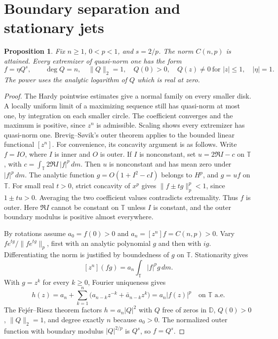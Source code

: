 \documentclass[11pt]{article}
\newtheorem{proposition}[theorem]{Proposition}
\newcommand{\D}{\mathbb D}
\newcommand{\T}{\mathbb T}
\newcommand{\coef}[1]{[z^{#1}]}
\begin{document}
\section{Boundary separation and stationary jets}

\begin{proposition}\label{prop:boundary}
Fix \(n\ge1\), \(0<p<1\), and \(s=2/p\). The norm \(C(n,p)\)
is attained. Every extremizer of quasi-norm one has the form
\[
 f=\eta Q^s,\qquad
 \deg Q=n,\quad \|Q\|_2=1,\quad Q(0)>0,\quad
 Q(z)\ne0\ \text{for }|z|\le1,\quad |\eta|=1 .
\]
The power uses the analytic logarithm of \(Q\) which is real at zero.
\end{proposition}

\begin{proof}
The Hardy pointwise estimates give a normal family on every smaller
disk. A locally uniform limit of a maximizing sequence still has
quasi-norm at most one, by integration on each smaller circle.
The coefficient converges and the maximum is positive, since \(z^n\)
is admissible. Scaling shows every extremizer has quasi-norm one.
Brevig--S{\o}vik's outer theorem \cite[Thm.~1]{BrevigSovik} applies
to the bounded linear functional \(\coef n\). For convenience, its
concavity argument is as follows. Write \(f=IO\), where \(I\) is
inner and \(O\) is outer. If \(I\) is nonconstant, set
\(u=2\Re I-c\) on \(\T\), with
\(c=\int_{\T}2\Re I\,|f|^p\,dm\). Then \(u\) is nonconstant and has
mean zero under \(|f|^p\,dm\). The analytic function
\(g=O(1+I^2-cI)\) belongs to \(H^p\), and \(g=uf\) on \(\T\).
For small real \(t>0\), strict concavity of \(x^p\) gives
\(\|f\pm tg\|_p^p<1\), since \(1\pm tu>0\).
Averaging the two coefficient values contradicts extremality.
Thus \(f\) is outer. Here \(\Re I\) cannot be constant on \(\T\)
unless \(I\) is constant, and the outer boundary modulus is positive
almost everywhere.

By rotations assume \(a_0=f(0)>0\) and \(a_n=\coef n f=C(n,p)>0\).
Vary \(f e^{t g}/\|f e^{t g}\|_p\), first with an analytic polynomial
\(g\) and then with \(ig\). Differentiating the norm is justified
by boundedness of \(g\) on \(\T\). Stationarity gives
\[
 \coef n(fg)=a_n\int_{\T}|f|^p g\,dm .
\]
With \(g=z^k\) for every \(k\ge0\), Fourier uniqueness gives
\[
 h(z)=a_n+\sum_{k=1}^n
       \bigl(a_{n-k}z^{-k}+\bar a_{n-k}z^k\bigr)
     =a_n |f(z)|^p \quad\text{on }\T\text{ a.e.}
\]
The Fej\'er--Riesz theorem factors \(h=a_n |Q|^2\) with
\(Q\) free of zeros in \(\D\), \(Q(0)>0\), \(\|Q\|_2=1\), and
degree exactly \(n\) because \(a_0>0\). The normalized outer function
with boundary modulus \(|Q|^{2/p}\) is \(Q^s\), so \(f=Q^s\).


\end{proof}
\end{document}
